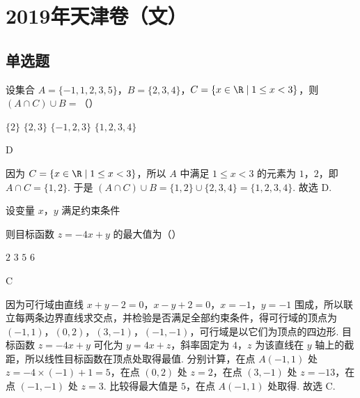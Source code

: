 \chapter{2019年天津卷（文）}

\section{单选题}

\begin{problem}
设集合 \(A=\{-1,1,2,3,5\}\)，\(B=\{2,3,4\}\)，\(C=\{x\in\R\mid 1\le x<3\}\)，则 \((A\cap C)\cup B=\)（\quad）

\choices
    {\(\{2\}\)}
    {\(\{2,3\}\)}
    {\(\{-1,2,3\}\)}
    {\(\{1,2,3,4\}\)}
\end{problem}

\begin{answer}
D
\end{answer}

\begin{solution}
因为 \(C=\{x\in\R\mid 1\le x<3\}\)，所以 \(A\) 中满足 \(1\le x<3\) 的元素为 \(1\)，\(2\)，即 \(A\cap C=\{1,2\}\). 于是 \(\left(A\cap C\right)\cup B=\{1,2\}\cup\{2,3,4\}=\{1,2,3,4\}\). 故选 D.
\end{solution}

\begin{problem}
设变量 \(x\)，\(y\) 满足约束条件


则目标函数 \(z=-4x+y\) 的最大值为（\quad）

\choices
    {\(2\)}
    {\(3\)}
    {\(5\)}
    {\(6\)}
\end{problem}

\begin{answer}
C
\end{answer}

\begin{solution}
因为可行域由直线 \(x+y-2=0\)，\(x-y+2=0\)，\(x=-1\)，\(y=-1\) 围成，所以联立每两条边界直线求交点，并检验是否满足全部约束条件，得可行域的顶点为 \(\left(-1,1\right)\)，\(\left(0,2\right)\)，\(\left(3,-1\right)\)，\(\left(-1,-1\right)\)，可行域是以它们为顶点的四边形. 目标函数 \(z=-4x+y\) 可化为 \(y=4x+z\)，斜率固定为 \(4\)，\(z\) 为该直线在 \(y\) 轴上的截距，所以线性目标函数在顶点处取得最值. 分别计算，在点 \(A\left(-1,1\right)\) 处 \(z=-4\times\left(-1\right)+1=5\)，在点 \(\left(0,2\right)\) 处 \(z=2\)，在点 \(\left(3,-1\right)\) 处 \(z=-13\)，在点 \(\left(-1,-1\right)\) 处 \(z=3\). 比较得最大值是 \(5\)，在点 \(A\left(-1,1\right)\) 处取得. 故选 C.
\end{solution}

